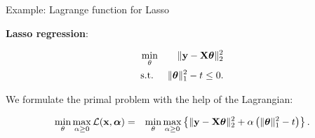 \documentclass[11pt,compress,t,notes=noshow, xcolor=table]{beamer}
\begin{document}
\begin{vbframe}{Example: Lagrange function for Lasso}

\textbf{Lasso regression}: 

\begin{eqnarray*}
	\min_\theta && \|\mathbf{y} - \mathbf{X} \bm{\theta}\|_2^2 \\
	\text{s.t. } && \|\bm{\theta}\|^2_1 - t \le 0.
\end{eqnarray*}

We formulate the primal problem with the help of the Lagrangian:

\begin{eqnarray*}
	\min_\theta \max_{\alpha \ge 0} \mathcal{L}(\mathbf{x}, \bm{\alpha}) &=& \min_\theta \max_{\alpha \ge 0} \left\{\|\mathbf{y} - \mathbf{X} \bm{\theta}\|_2^2 + \alpha \left(\|\bm{\theta}\|^2_1 - t\right)\right\}.
\end{eqnarray*}


\end{vbframe}
\end{document}
